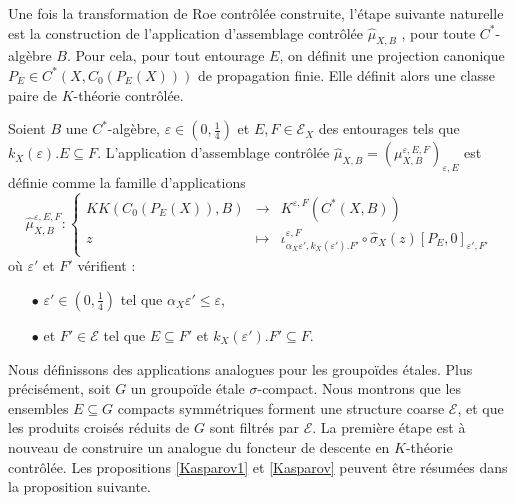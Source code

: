 Une fois la transformation de Roe contrôlée construite, l'étape suivante naturelle est la construction de l'application d'assemblage contrôlée $\hat\mu_{X,B}$ , pour toute $C^*$-algèbre $B$. Pour cela, pour tout entourage $E$, on définit une projection canonique $P_E\in C^*(X,C_0(P_E(X)))$ de propagation finie. Elle définit alors une classe paire de $K$-théorie contrôlée.

\begin{definitionfr}
Soient $B$ une $C^*$-algèbre, $\varepsilon\in (0,\frac{1}{4})$ et $E,F\in\mathcal E_X$ des entourages tels que $k_X(\varepsilon).E\subseteq F$. L'application d'assemblage contrôlée $\hat\mu_{X,B}=(\mu_{X,B}^{\varepsilon,E,F})_{\varepsilon,E}$ est définie comme la famille d'applications
\[\hat\mu_{X,B}^{\varepsilon, E,F} :\left\{\begin{array}{rcl} KK(C_0(P_E(X)),B) & \rightarrow & K^{\varepsilon, F}(C^*(X,B)) \\
					z & \mapsto & \iota_{\alpha_X \varepsilon',k_X(\varepsilon').F'}^{\varepsilon,F}\circ\hat\sigma_X(z)[P_{E},0]_{\varepsilon', F'}\end{array}\right.\]
où $\varepsilon'$ et $F'$ vérifient :
\begin{itemize}
\item[$\bullet$] $\varepsilon'\in (0,\frac{1}{4})$ tel que $\alpha_X \varepsilon'\leq \varepsilon$,
\item[$\bullet$] et $F'\in\mathcal E$ tel que $E\subseteq F'$ et $k_X(\varepsilon').F'\subseteq F$.
\end{itemize}
\end{definitionfr}

Nous définissons des applications analogues pour les groupoïdes étales. Plus précisément, soit $G$ un groupoïde étale $\sigma$-compact. Nous montrons que les ensembles $E\subseteq G$ compacts symmétriques forment une structure coarse $\mathcal E$, et que les produits croisés réduits de $G$ sont filtrés par $\mathcal E$. La première étape est à nouveau de construire un analogue du foncteur de descente en $K$-théorie contrôlée. Les propositions \ref{Kasparov1} et \ref{Kasparov} peuvent être résumées dans la proposition suivante. 

